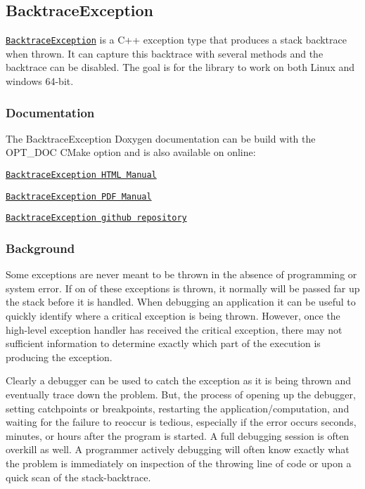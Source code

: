 \href{https://travis-ci.org/markjolah/BacktraceException}{\tt } \subsection*{Backtrace\-Exception}

\href{https://markjolah.github.io/BacktraceException/classbacktrace__exception_1_1BacktraceException.html}{\tt Backtrace\-Exception} is a C++ exception type that produces a stack backtrace when thrown. It can capture this backtrace with several methods and the backtrace can be disabled. The goal is for the library to work on both Linux and windows 64-\/bit.

\subsubsection*{Documentation}

The Backtrace\-Exception Doxygen documentation can be build with the {\ttfamily O\-P\-T\-\_\-\-D\-O\-C} C\-Make option and is also available on online\-:
\begin{DoxyItemize}
\item \href{https://markjolah.github.io/BacktraceException/index.html}{\tt Backtrace\-Exception H\-T\-M\-L Manual}
\item \href{https://markjolah.github.io/BacktraceException/pdf/BacktraceException-0.2-reference.pdf}{\tt Backtrace\-Exception P\-D\-F Manual}
\item \href{https://github.com/markjolah/BacktraceException}{\tt Backtrace\-Exception github repository}
\end{DoxyItemize}

\subsubsection*{Background}

Some exceptions are never meant to be thrown in the absence of programming or system error. If on of these exceptions is thrown, it normally will be passed far up the stack before it is handled. When debugging an application it can be useful to quickly identify where a critical exception is being thrown. However, once the high-\/level exception handler has received the critical exception, there may not sufficient information to determine exactly which part of the execution is producing the exception.

Clearly a debugger can be used to catch the exception as it is being thrown and eventually trace down the problem. But, the process of opening up the debugger, setting catchpoints or breakpoints, restarting the application/computation, and waiting for the failure to reoccur is tedious, especially if the error occurs seconds, minutes, or hours after the program is started. A full debugging session is often overkill as well. A programmer actively debugging will often know exactly what the problem is immediately on inspection of the throwing line of code or upon a quick scan of the stack-\/backtrace.

